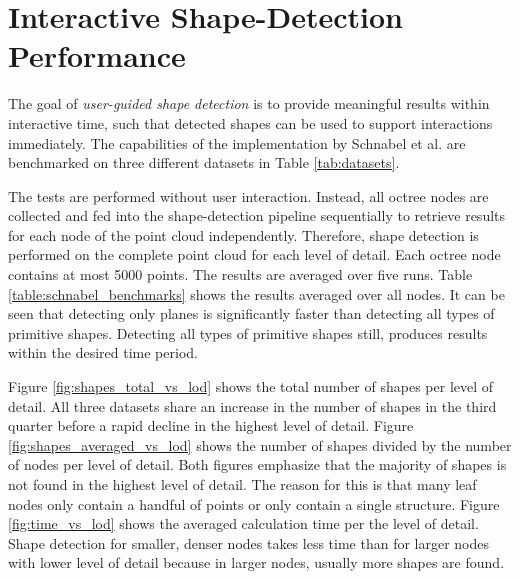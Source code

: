 \section{Interactive Shape-Detection Performance}
\label{sec:shape_detection_performance}

The goal of \textit{user-guided shape detection} is to provide meaningful results within interactive time, such that detected shapes can be used to support interactions immediately. The capabilities of the implementation by Schnabel et al. \cite{schnabel-2007-software} are benchmarked on three different datasets in Table \ref{tab:datasets}. 

\par

The tests are performed without user interaction. Instead, all octree nodes are collected and fed into the shape-detection pipeline sequentially to retrieve results for each node of the point cloud independently. Therefore, shape detection is performed on the complete point cloud for each level of detail. Each octree node contains at most 5000 points. The results are averaged over five runs. Table \ref{table:schnabel_benchmarks} shows the results averaged over all nodes. It can be seen that detecting only planes is significantly faster than detecting all types of primitive shapes. Detecting all types of primitive shapes still, produces results within the desired time period. 

\par

Figure \ref{fig:shapes_total_vs_lod} shows the total number of shapes per level of detail. All three datasets share an increase in the number of shapes in the third quarter before a rapid decline in the highest level of detail. 
Figure \ref{fig:shapes_averaged_vs_lod} shows the number of shapes divided by the number of nodes per level of detail. Both figures emphasize that the majority of shapes is not found in the highest level of detail. The reason for this is that many leaf nodes only contain a handful of points or only contain a single structure. 
Figure \ref{fig:time_vs_lod} shows the averaged calculation time per the level of detail. Shape detection for smaller, denser nodes takes less time than for larger nodes with lower level of detail because in larger nodes, usually more shapes are found. 


